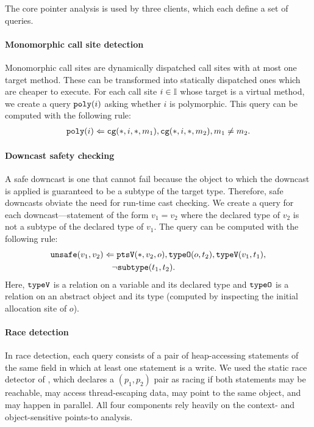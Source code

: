 
The core pointer analysis is used by three clients, which each define a set of queries.

\paragraph{Monomorphic call site detection}

Monomorphic call sites are dynamically dispatched call sites with at most one
target method.  These can be transformed into statically dispatched ones which
are cheaper to execute.
For each call site $i \in {\mathbb I}$ whose target is a virtual method,
we create a query $\text{\tt poly}(i)$ asking whether $i$ is polymorphic.
This query can be computed with the following rule:
\begin{align}
\text{\tt poly}(i) \Leftarrow \text{\tt cg}(*,i,*,m_1), \text{\tt cg}(*,i,*,m_2), m_1 \neq m_2.
\end{align}

\paragraph{Downcast safety checking}

A safe downcast is one that cannot fail because the object to which the
downcast is applied is guaranteed to be a subtype of the target type.
Therefore, safe downcasts obviate the need for run-time cast checking.
We create a query for each downcast---statement of the form $v_1 = v_2$ where the
declared type of $v_2$ is not a subtype of the declared type of $v_1$.
The query can be computed with the following rule:
\begin{align}
& \text{\tt unsafe}(v_1,v_2) \Leftarrow \text{\tt ptsV}(*,v_2,o), \text{\tt typeO}(o,t_2), \text{\tt typeV}(v_1,t_1), \nonumber \\
& \hspace{1in} \neg\text{\tt subtype}(t_1,t_2).
\end{align}
Here, $\text{\tt typeV}$ is a relation on a variable and its declared type
and $\text{\tt typeO}$ is a relation on an abstract object and its type
(computed by inspecting the initial allocation site of $o$).

\paragraph{Race detection}

In race detection, each query consists of a pair of heap-accessing statements
of the same field in which at least one statement is a write.  We used the
static race detector of \cite{NaikAikenWhaley2006}, which declares a
$(p_1,p_2)$ pair as racing if both statements may be reachable, may access
thread-escaping data, may point to the same object, and may happen in parallel.
All four components rely heavily on the context- and object-sensitive points-to
analysis.
